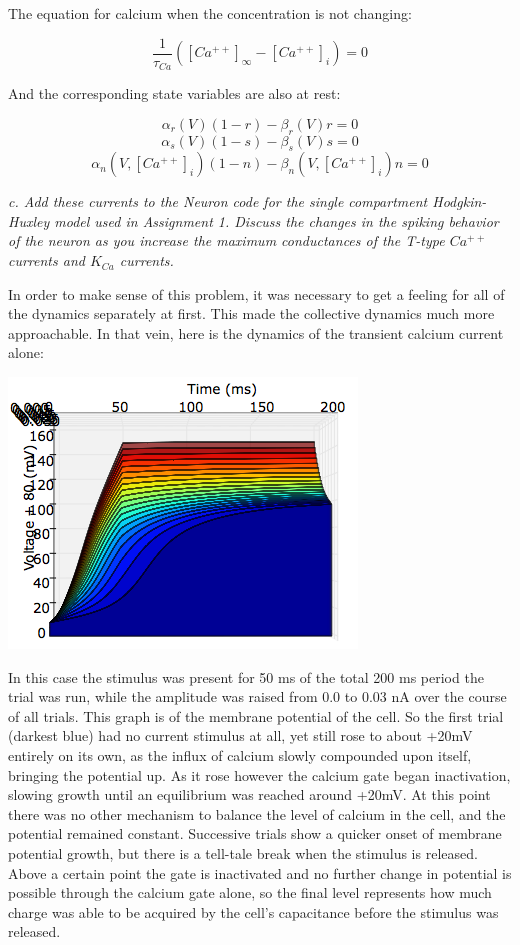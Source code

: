 \documentclass[12pt]{article}
\begin{document}
The equation for calcium when the concentration is not changing:

$$ \frac{1}{\tau_{Ca}}([Ca^{++}]_{\infty}-[Ca^{++}]_i)=0 $$

And the corresponding state variables are also at rest:

$$ \alpha_r(V)(1-r)-\beta_r(V)r=0 $$
$$ \alpha_s(V)(1-s)-\beta_s(V)s=0 $$
$$ \alpha_n(V,[Ca^{++}]_i)(1-n)-\beta_n(V,[Ca^{++}]_i)n=0 $$

\vspace{10pt}

\emph{c.  Add these currents to the Neuron code for the single compartment Hodgkin-Huxley model used in Assignment 1. Discuss the changes in the spiking behavior of the neuron as you increase the maximum conductances of the T-type $Ca^{++}$ currents and $K_{Ca}$ currents.}

\vspace{10pt}

In order to make sense of this problem, it was necessary to get a feeling for all of the dynamics separately at first.  This made the collective dynamics much more approachable.  In that vein, here is the dynamics of the transient calcium current alone:

\includegraphics[scale=0.8]{transientcalciumthreshhold.png}

In this case the stimulus was present for 50 ms of the total 200 ms period the trial was run, while the amplitude was raised from 0.0 to 0.03 nA over the course of all trials.  This graph is of the membrane potential of the cell.  So the first trial (darkest blue) had no current stimulus at all, yet still rose to about +20mV entirely on its own, as the influx of calcium slowly compounded upon itself, bringing the potential up.  As it rose however the calcium gate began inactivation, slowing growth until an equilibrium was reached around +20mV.  At this point there was no other mechanism to balance the level of calcium in the cell, and the potential remained constant.  Successive trials show a quicker onset of membrane potential growth, but there is a tell-tale break when the stimulus is released.  Above a certain point the gate is inactivated and no further change in potential is possible through the calcium gate alone, so the final level represents how much charge was able to be acquired by the cell's capacitance before the stimulus was released.  
\end{document}
